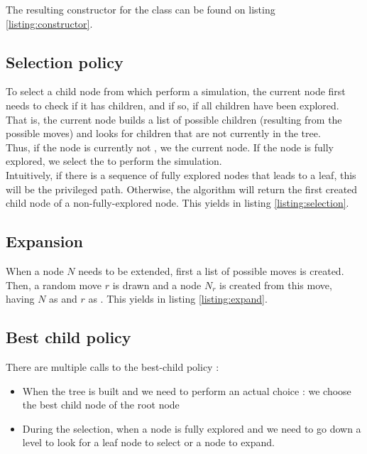 \documentclass[11pt,a4paper]{article}
\begin{document}
The resulting constructor for the class  can be found on listing \ref{listing:constructor}.

\subsection{Selection policy}
To select a child node from which perform a simulation, the current node first needs to check if it has children, and if so, if all children have been explored. That is, the current node builds a list of possible children (resulting from the possible moves) and looks for children that are not currently in the tree. \\

Thus, if the node is currently not , we  the current node. If the node is fully explored, we select the  to perform the simulation. \\

Intuitively, if there is a sequence of fully explored nodes that leads to a leaf, this will be the privileged path. Otherwise, the algorithm will return the first created child node of a non-fully-explored node. This yields in listing \ref{listing:selection}.

\subsection{Expansion}
When a node $N$ needs to be extended, first a list of possible moves is created. Then, a random move $r$ is drawn and a node $N_r$ is created from this move, having $N$ as  and $r$ as . This yields in listing \ref{listing:expand}.
\subsection{Best child policy}
There are multiple calls to the best-child policy :
\begin{itemize}
    \item When the tree is built and we need to perform an actual choice : we choose the best child node of the root node 
    \item During the selection, when a node is fully explored and we need to go down a level to look for a leaf node to select or a node to expand. \\
\end{itemize}
\end{document}
